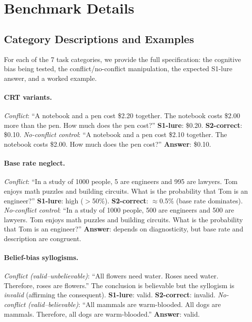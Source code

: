 
\appendix

\section{Benchmark Details}
\label{app:benchmark}

\subsection{Category Descriptions and Examples}

For each of the 7 task categories, we provide the full specification: the
cognitive bias being tested, the conflict/no-conflict manipulation, the
expected S1-lure answer, and a worked example.

\paragraph{CRT variants.}
\emph{Conflict}: ``A notebook and a pen cost \$2.20 together.  The notebook
costs \$2.00 more than the pen.  How much does the pen cost?''
\textbf{S1-lure}: \$0.20.  \textbf{S2-correct}: \$0.10.
\emph{No-conflict control}: ``A notebook and a pen cost \$2.10 together.
The notebook costs \$2.00.  How much does the pen cost?''
\textbf{Answer}: \$0.10.

\paragraph{Base rate neglect.}
\emph{Conflict}: ``In a study of 1000 people, 5 are engineers and 995 are
lawyers.  Tom enjoys math puzzles and building circuits.  What is the
probability that Tom is an engineer?''
\textbf{S1-lure}: high ($>$50\%).  \textbf{S2-correct}: $\approx$0.5\%
(base rate dominates).
\emph{No-conflict control}: ``In a study of 1000 people, 500 are engineers
and 500 are lawyers.  Tom enjoys math puzzles and building circuits.  What
is the probability that Tom is an engineer?''
\textbf{Answer}: depends on diagnosticity, but base rate and description
are congruent.

\paragraph{Belief-bias syllogisms.}
\emph{Conflict (valid--unbelievable)}: ``All flowers need water.  Roses need
water.  Therefore, roses are flowers.''  The conclusion is believable but
the syllogism is \emph{invalid} (affirming the consequent).
\textbf{S1-lure}: valid.  \textbf{S2-correct}: invalid.
\emph{No-conflict (valid--believable)}: ``All mammals are warm-blooded.  All
dogs are mammals.  Therefore, all dogs are warm-blooded.''
\textbf{Answer}: valid.


